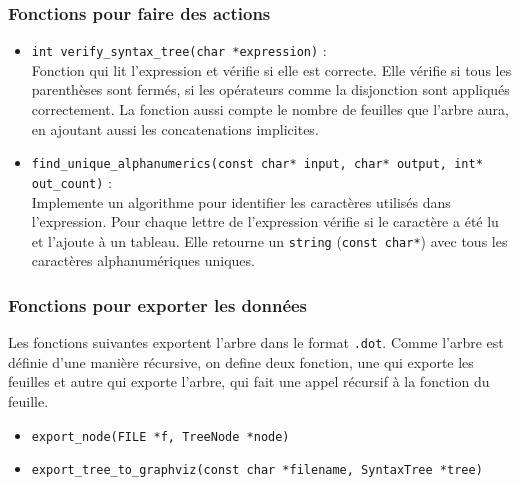 \documentclass[12pt]{article}
\begin{document}
\subsubsection{Fonctions pour faire des actions}
\begin{itemize}
  \item \lstinline|int verify_syntax_tree(char *expression)| : \\
  Fonction qui lit l'expression et vérifie si elle est correcte. Elle vérifie si tous les parenthèses sont fermés, si les opérateurs comme la disjonction sont appliqués correctement. La fonction aussi compte le nombre de feuilles que l'arbre aura, en ajoutant aussi les concatenations implicites.
  \item \lstinline|find_unique_alphanumerics(const char* input, char* output, int* out_count)| : \\
  Implemente un algorithme pour identifier les caractères utilisés dans l'expression. Pour chaque lettre de l'expression vérifie si le caractère a été lu et l'ajoute à un tableau. Elle retourne un \texttt{string} (\lstinline|const char*|) avec tous les caractères alphanumériques uniques.
\end{itemize}


\subsubsection{Fonctions pour exporter les données}
Les fonctions suivantes exportent l'arbre dans le format \texttt{.dot}. Comme l'arbre est définie d'une manière récursive, on define deux fonction, une qui exporte les feuilles et autre qui exporte l'arbre, qui fait une appel récursif à la fonction du feuille.
\begin{itemize}
  \item \lstinline|export_node(FILE *f, TreeNode *node)|
  \item \lstinline|export_tree_to_graphviz(const char *filename, SyntaxTree *tree)|
\end{itemize}
\end{document}
